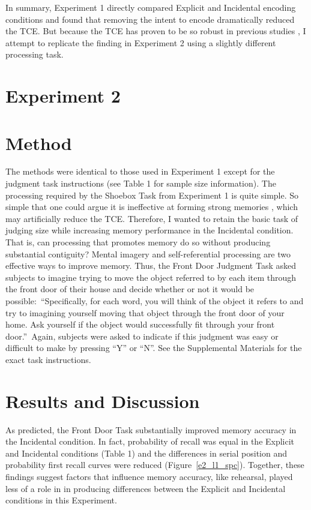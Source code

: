 \documentclass[man,natbib,floatsintext]{apa6} %
\begin{document}
In summary, Experiment 1 directly compared Explicit and Incidental encoding conditions and found that removing the intent to encode dramatically reduced the TCE. \color{black} But because the TCE has proven to be so robust in previous studies \citep{HealKaha17}, I attempt to replicate the finding in Experiment 2 using a slightly different processing task.




\section{Experiment 2}
\section{Method}

The methods were identical to those used in Experiment 1 except for the judgment task instructions (see Table 1 for sample size information).
The processing required by the Shoebox Task from Experiment 1 is quite simple. So simple that one could argue it is  ineffective at forming strong memories \label{newcite}\citep{EaglLeit64}, which may artificially reduce the TCE. Therefore, I wanted to retain the basic task of judging size while increasing memory performance in the Incidental condition. That is, can processing that promotes memory do so without producing substantial contiguity? Mental imagery and self-referential processing are two effective ways to improve memory. Thus, the Front Door Judgment Task asked subjects to imagine trying to move the object referred to by each item through the front door of their house and decide whether or not it would be possible:~\label{newinst}\color{red}``Specifically, for each word, you will think of the object it refers to and try to imagining yourself moving that object through the front door of your home. Ask yourself if the object would successfully fit through your front door.''\color{black}~Again, subjects were asked to indicate if this judgment was easy or difficult to make by pressing ``Y'' or ``N''. See the Supplemental Materials for the exact task instructions.

\section{Results and Discussion}
As predicted, the Front Door Task substantially improved memory accuracy in the Incidental condition. In fact, probability of recall was equal in the Explicit and Incidental conditions (Table 1) \color{red} and the differences in serial position and probability first recall curves were reduced (Figure~\ref{e2_l1_spc}). Together, these findings suggest factors that influence memory accuracy, like rehearsal, played less of a role in in producing differences between the Explicit and Incidental conditions in this Experiment.
\end{document}
